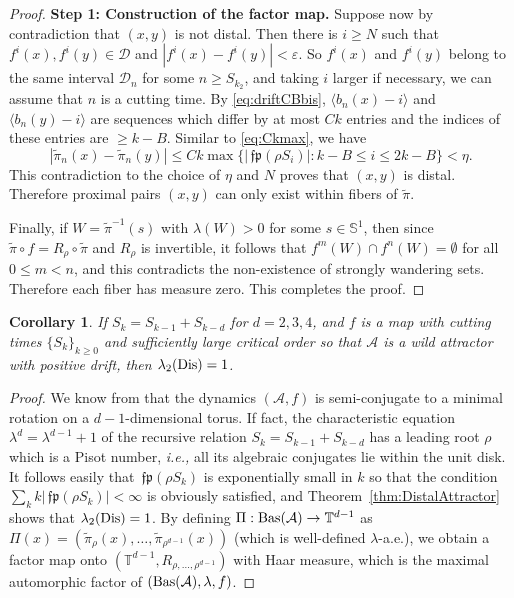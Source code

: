 \documentclass[12pt, psamsfonts, reqno]{amsart}
\newtheorem{corollary}[theorem]{Corollary}
\begin{document}
\begin{proof} {\bf Step 1: Construction of the factor map.}
Suppose now by contradiction that $(x,y)$ is not distal. Then
there is $i \geq N$ such that $f^i(x), f^i(y) \in \mathcal D$ and
$|f^i(x)-f^i(y)| < {\varepsilon}$. So $f^i(x)$ and $f^i(y)$ belong to the
same interval ${{\mathcal D}}_n$ for some $n \geq S_{k_2}$, and taking $i$
larger if necessary, we can assume that $n$ is a cutting time. By
\eqref{eq:driftCBbis}, $\langle b_n(x)-i \rangle$ and $\langle
b_n(y)-i\rangle$ are sequences which differ by at most $C k$
entries and the indices of these entries are $\geq k-B$. Similar
to \eqref{eq:Ckmax}, we have
$$
|\tilde \pi_n(x) - \tilde \pi_n(y)| \leq C k
\max\{ |{\,\mathfrak{fp}}( \rho S_i )| : k-B \leq i \leq 2k-B \}
< \eta.
$$
This contradiction to the
choice of $\eta$ and $N$ proves that $(x,y)$ is distal.
Therefore proximal pairs $(x,y)$ can only exist within fibers of $\tilde \pi$.

Finally, if $W = \tilde \pi^{-1}(s)$ with $\lambda(W) > 0$ for some $s
\in {{\mathbb S}}^1$, then since $\tilde \pi \circ f = R_\rho \circ \tilde \pi$ and
$R_\rho$ is invertible, it follows that $f^m(W) \cap f^n(W) =
\emptyset$ for all $0 \leq m < n$, and this contradicts the
non-existence of strongly wandering sets. Therefore each fiber has
measure zero. This completes the proof.
\end{proof}

\begin{corollary}\label{Cor:d=234}
If $S_k = S_{k-1} + S_{k-d}$ for $d = 2,3,4$, and $f$ is a map
with cutting times $\{ S_k\}_{k \geq 0}$ and sufficiently large
critical order so that ${{\mathcal A}}$ is a wild attractor with
positive drift, then $\lambda_2({\mathop{\rm Dis}\nolimits}) = 1$.
\end{corollary}

\begin{proof}
We know from \cite{BKS} that the dynamics  $({{\mathcal A}}, f)$  is
semi-conjugate to a minimal rotation on a $d-1$-dimensional torus.
If fact, the characteristic equation  $\lambda^d = \lambda^{d-1}
+ 1$ of the recursive relation $S_k = S_{k-1} + S_{k-d}$ has a
leading root $\rho$ which is a Pisot number, {{\em i.e., }} all its algebraic
conjugates lie within the unit disk. It follows easily that ${\,\mathfrak{fp}}(
\rho S_k )$ is exponentially small in $k$ so that the condition
$\sum_k k |{\,\mathfrak{fp}}( \rho S_k )| < \infty$ is obviously satisfied, and
Theorem~\ref{thm:DistalAttractor} shows that $\lambda_2({\mathop{\rm Dis}\nolimits}) = 1$.
By defining $\Pi:{\mathop{\rm Bas}\nolimits}({{\mathcal A}}) \to {{\mathbb T}}^{d-1}$ as $\Pi(x) =
(\tilde \pi_\rho(x), \dots , \tilde \pi_{\rho^{d-1}}(x))$
(which is well-defined $\lambda$-a.e.), we obtain a factor
map onto $({{\mathbb T}}^{d-1}, R_{\rho,\dots,\rho^{d-1}})$ with Haar
measure, which is the maximal automorphic factor of
$({\mathop{\rm Bas}\nolimits}({{\mathcal A}}), \lambda, f)$.
\end{proof}
\end{document}
